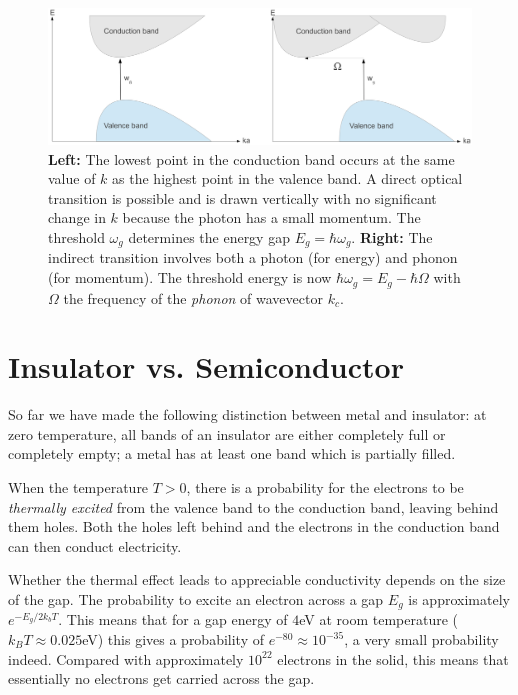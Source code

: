 \documentclass{Textbook}
\begin{document}
\begin{figure}[!ht] 
  \centering
  \includegraphics[width=15cm]{optical_absorptions}
  \caption{\textbf{Left:} The lowest point in the conduction band occurs at the same value of $k$ as the highest point in the valence band. A direct optical transition is possible and is drawn vertically with no significant change in $k$ because the photon has a small momentum. The threshold $\omega_g$ determines the energy gap $E_g = \hbar\omega_g$. \textbf{Right:} The indirect transition involves both a photon (for energy) and phonon (for momentum). The threshold energy is now $\hbar \omega_g = E_g - \hbar \Omega$ with $\Omega$ the frequency of the \emph{phonon} of wavevector $k_c$. }
  \label{fig:optical_absorption}
\end{figure}


\section{Insulator vs. Semiconductor}
So far we have made the following distinction between metal and insulator: at zero temperature, all bands of an insulator are either completely full or completely empty; a metal has at least one band which is partially filled.

When the temperature $T>0$, there is a probability for the electrons to be \emph{thermally excited} from the valence band to the conduction band, leaving behind them holes. Both the holes left behind and the electrons in the conduction band can then conduct electricity.

Whether the thermal effect leads to appreciable conductivity depends on the size of the gap. The probability to excite an electron across a gap $E_g$ is approximately $e^{-E_g/2k_bT}$. This means that for a gap energy of $4$eV at room temperature ($k_B T \approx 0.025$eV) this gives a probability of $e^{-80}\approx 10^{-35}$, a very small probability indeed. Compared with approximately $10^{22}$ electrons in the solid, this means that essentially no electrons get carried across the gap.
\end{document}

